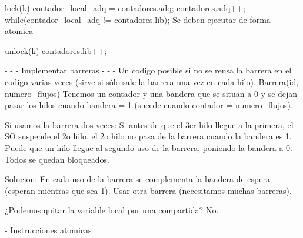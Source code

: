 lock(k){
    contador_local_adq = contadores.adq;
    contadores.adq++;
    while(contador_local_adq != contadores.lib){;}
}
Se deben ejecutar de forma atomica

unlock(k){
    contadores.lib++;
}


- - - Implementar barreras - - -
Un codigo posible si no se reusa la barrera en el codigo varias veces (sirve si sólo sale la barrera una vez en cada hilo).
Barrera(id, numero_flujos)
Tenemos un contador y una bandera que se situan a 0 y se dejan pasar los hilos cuando bandera = 1 (sucede cuando contador = numero_flujos).

Si usamos la barrera dos veces:
Si antes de que el 3er hilo llegue a la primera, el SO suspende el 2o hilo. el 2o hilo no pasa de la barrera cuando la bandera es 1. Puede que un hilo llegue al segundo uso de la barrera, poniendo la bandera a 0. Todos se quedan bloqueados.

Solucion:
En cada uso de la barrera se complementa la bandera de espera (esperan mientras que sea 1).
Usar otra barrera (necesitamos muchas barreras).

¿Podemos quitar la variable local por una compartida?
No.



- Instrucciones atomicas
